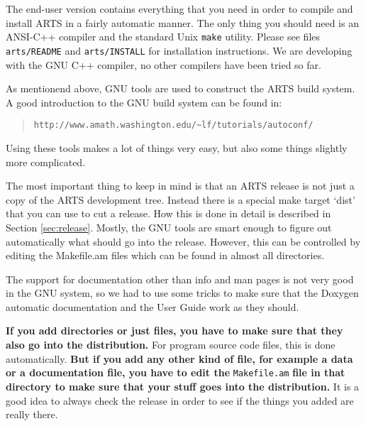 The end-user version contains everything that you need in order to
compile and install ARTS in a fairly automatic manner. The only
thing you should need is an ANSI-C++ compiler and the standard Unix
\verb|make| utility. Please see files \verb|arts/README| and
\verb|arts/INSTALL| for installation instructions. We are developing
with the GNU C++ compiler, no other compilers have been tried so
far.


As mentionend above, GNU tools are used to construct the ARTS
build system. A good introduction to the GNU build system can be found in:
\begin{quote}
  \footnotesize
  \verb|http://www.amath.washington.edu/~lf/tutorials/autoconf/|
\end{quote}
Using these tools makes a lot of things very easy, but also some
things slightly more complicated.

The most important thing to keep in mind is that an ARTS release
is not just a copy of the ARTS development tree. Instead there is a
special make target `dist' that you can use to cut a release. How this
is done in detail is described in Section \ref{sec:release}. Mostly,
the GNU tools are smart enough to figure out automatically what should
go into the release. However, this can be controlled by editing the
Makefile.am files which can be found in almost all directories.

The support for documentation other than info and man pages is not
very good in the GNU system, so we had to use some tricks to make sure
that the Doxygen automatic documentation and the User Guide work as they
should. 
%
%

\textbf{If you add directories or just files, you have to make sure
  that they also go into the distribution.} For program source code
files, this is done automatically. \textbf{But if you add any other
  kind of file, for example a data or a documentation file, you have
  to edit the} \verb|Makefile.am| \textbf{file in that directory to
  make sure that your stuff goes into the distribution.} It is a good
idea to always check the release in order to see if the things you
added are really there.


